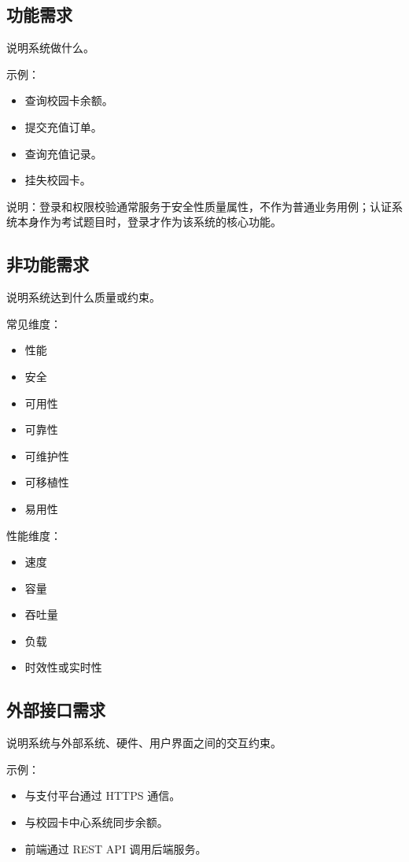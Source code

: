 \documentclass[UTF8,zihao=-4]{ctexart}
\begin{document}
\subsection{功能需求}

说明系统做什么。

示例：

\begin{itemize}
\item 查询校园卡余额。
\item 提交充值订单。
\item 查询充值记录。
\item 挂失校园卡。
\end{itemize}

说明：登录和权限校验通常服务于安全性质量属性，不作为普通业务用例；认证系统本身作为考试题目时，登录才作为该系统的核心功能。

\subsection{非功能需求}

说明系统达到什么质量或约束。

常见维度：

\begin{itemize}
\item 性能
\item 安全
\item 可用性
\item 可靠性
\item 可维护性
\item 可移植性
\item 易用性
\end{itemize}

性能维度：

\begin{itemize}
\item 速度
\item 容量
\item 吞吐量
\item 负载
\item 时效性或实时性
\end{itemize}

\subsection{外部接口需求}

说明系统与外部系统、硬件、用户界面之间的交互约束。

示例：

\begin{itemize}
\item 与支付平台通过 HTTPS 通信。
\item 与校园卡中心系统同步余额。
\item 前端通过 REST API 调用后端服务。
\end{itemize}
\end{document}
